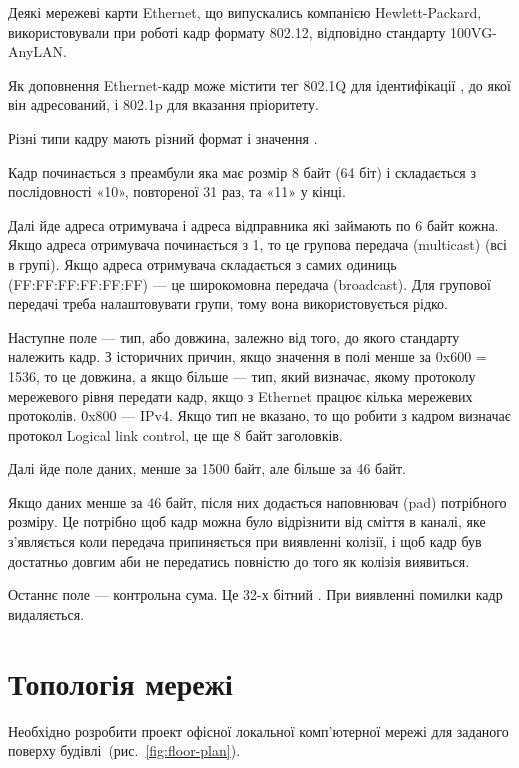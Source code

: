 \documentclass[
  ukrainian,
  simple,
  floatsection,
]{eskdnaukvd}
\begin{document}
      Деякі мережеві карти \textenglish{Ethernet}, що випускались компанією \textenglish{Hewlett-Packard}, використовували при роботі кадр формату \textenglish{ 802.12}, відповідно стандарту \textenglish{100VG-AnyLAN}.

      Як доповнення Ethernet-кадр може містити тег \textenglish{ 802.1Q} для ідентифікації \textenglish{}, до якої він адресований, і \textenglish{ 802.1p} для вказання пріоритету.

      Різні типи кадру мають різний формат і значення \textenglish{}.

      Кадр починається з преамбули яка має розмір 8 байт (64 біт) і складається з послідовності «10», повтореної 31 раз, та «11» у кінці.

      Далі йде адреса отримувача і адреса відправника які займають по 6 байт кожна. Якщо адреса отримувача починається з 1, то це групова передача (multicast) (всі в групі). Якщо адреса отримувача складається з самих одиниць (FF:FF:FF:FF:FF:FF) — це широкомовна передача (broadcast). Для групової передачі треба налаштовувати групи, тому вона використовується рідко.

      Наступне поле — тип, або довжина, залежно від того, до якого стандарту належить кадр. З історичних причин, якщо значення в полі менше за 0x600 = 1536, то це довжина, а якщо більше — тип, який визначає, якому протоколу мережевого рівня передати кадр, якщо з \textenglish{Ethernet} працює кілька мережевих протоколів. 0x800 — IPv4. Якщо тип не вказано, то що робити з кадром визначає протокол \textenglish{Logical link control}, це ще 8 байт заголовків.

      Далі йде поле даних, менше за 1500 байт, але більше за 46 байт.

      Якщо даних менше за 46 байт, після них додається наповнювач (\textenglish{pad}) потрібного розміру. Це потрібно щоб кадр можна було відрізнити від сміття в каналі, яке з'являється коли передача припиняється при виявленні колізії, і щоб кадр був достатньо довгим аби не передатись повністю до того як колізія виявиться.

      Останнє поле — контрольна сума. Це 32-х бітний \textenglish{}. При виявленні помилки кадр видаляється.

  \section{Топологія мережі}
    Необхідно розробити проект офісної локальної комп'ютерної мережі для заданого поверху будівлі~(рис.~\ref{fig:floor-plan}).
\end{document}
